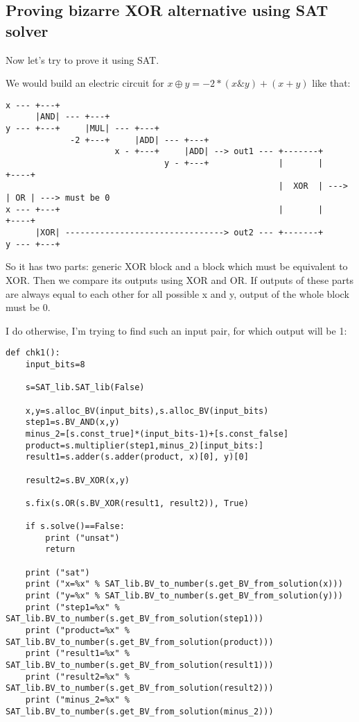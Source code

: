 \subsection{Proving bizarre XOR alternative using SAT solver}
\label{weird_XOR_SAT}

Now let's try to prove it using SAT.

We would build an electric circuit for $x \oplus y = -2*(x \& y) + (x + y)$ like that:

\begin{lstlisting}[basicstyle=\small]
x --- +---+
      |AND| --- +---+     
y --- +---+     |MUL| --- +---+
             -2 +---+     |ADD| --- +---+
                      x - +---+     |ADD| --> out1 --- +-------+
                                y - +---+              |       |      +----+
                                                       |  XOR  | ---> | OR | ---> must be 0
x --- +---+                                            |       |      +----+
      |XOR| --------------------------------> out2 --- +-------+
y --- +---+
\end{lstlisting}

So it has two parts: generic XOR block and a block which must be equivalent to XOR.
Then we compare its outputs using XOR and OR.
If outputs of these parts are always equal to each other for all possible x and y, output of the whole block must be 0.

I do otherwise, I'm trying to find such an input pair, for which output will be 1:

\begin{lstlisting}
def chk1():
    input_bits=8

    s=SAT_lib.SAT_lib(False)

    x,y=s.alloc_BV(input_bits),s.alloc_BV(input_bits)
    step1=s.BV_AND(x,y)
    minus_2=[s.const_true]*(input_bits-1)+[s.const_false]
    product=s.multiplier(step1,minus_2)[input_bits:]
    result1=s.adder(s.adder(product, x)[0], y)[0]

    result2=s.BV_XOR(x,y)

    s.fix(s.OR(s.BV_XOR(result1, result2)), True)

    if s.solve()==False:
        print ("unsat")
        return

    print ("sat")
    print ("x=%x" % SAT_lib.BV_to_number(s.get_BV_from_solution(x)))
    print ("y=%x" % SAT_lib.BV_to_number(s.get_BV_from_solution(y)))
    print ("step1=%x" % SAT_lib.BV_to_number(s.get_BV_from_solution(step1)))
    print ("product=%x" % SAT_lib.BV_to_number(s.get_BV_from_solution(product)))
    print ("result1=%x" % SAT_lib.BV_to_number(s.get_BV_from_solution(result1)))
    print ("result2=%x" % SAT_lib.BV_to_number(s.get_BV_from_solution(result2)))
    print ("minus_2=%x" % SAT_lib.BV_to_number(s.get_BV_from_solution(minus_2)))
\end{lstlisting}

